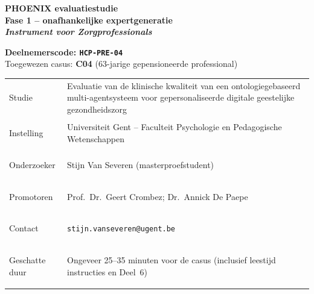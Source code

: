 \documentclass[11pt,a4paper]{article}
\renewcommand{\arraystretch}{1.28}
\begin{document}
\thispagestyle{fancy}
\vspace*{0.3cm}

\begin{tcolorbox}[
  colback=DarkBlue,colframe=DarkBlue,
  arc=3mm,left=14pt,right=14pt,top=12pt,bottom=12pt,
  width=\textwidth
]
\centering
{\fontsize{22}{28}\selectfont\bfseries\color{white}
PHOENIX evaluatiestudie\\[0.3em]
\fontsize{15}{20}\selectfont\color{AccentBlue}
Fase 1 -- onafhankelijke expertgeneratie\\[0.2em]
\fontsize{12}{16}\selectfont\color{white}
\textit{Instrument voor Zorgprofessionals}
}
\end{tcolorbox}

\vspace{0.6cm}

\begin{center}
\begin{tcolorbox}[
  colback=AccentBlue,colframe=PrimaryBlue,
  arc=2.5mm,boxrule=1.2pt,left=12pt,right=12pt,top=10pt,bottom=10pt,
  width=0.86\textwidth
]
\centering
{\large\bfseries\color{DarkBlue}Deelnemerscode: \texttt{HCP-PRE-04}}\\[0.5em]
{\normalsize\color{SlateMid}
Toegewezen casus:\quad
\textbf{\color{PrimaryBlue}C04} (63-jarige gepensioneerde professional)
}
\end{tcolorbox}
\end{center}

\vspace{0.5cm}

\begin{center}
\begin{tcolorbox}[
  colback=SoftBG,colframe=BorderGrey,
  arc=2mm,left=10pt,right=10pt,top=9pt,bottom=9pt,
  width=0.92\textwidth
]
\small\renewcommand{\arraystretch}{1.28}
\begin{tabularx}{\textwidth}{@{}>{\bfseries\raggedright\arraybackslash}p{}X@{}}
Studie & Evaluatie van de klinische kwaliteit van een ontologiegebaseerd multi-agentsysteem voor gepersonaliseerde digitale geestelijke gezondheidszorg \\
Instelling & Universiteit Gent -- Faculteit Psychologie en Pedagogische Wetenschappen \\
Onderzoeker & Stijn Van Severen (masterproefstudent) \\
Promotoren & Prof.\ Dr.\ Geert Crombez; Dr.\ Annick De Paepe \\
Contact & \texttt{stijn.vanseveren@ugent.be} \\
Geschatte duur & Ongeveer 25--35 minuten voor de casus (inclusief leestijd instructies en Deel~6) \\
\end{tabularx}
\end{tcolorbox}
\end{center}
\end{document}
